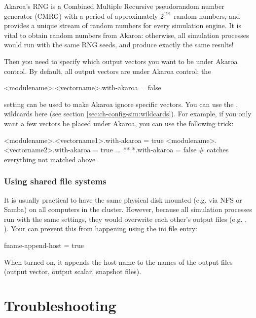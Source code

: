 Akaroa's RNG is a Combined Multiple Recursive pseudorandom
number generator (CMRG) with a period of approximately $2^{191}$
random numbers, and provides a unique stream of random numbers
for every simulation engine. It is vital to obtain random numbers
from Akaroa: otherwise, all simulation processes would run with the same
RNG seeds, and produce exactly the same results!

Then you need to specify which output vectors you want to
be under Akaroa control. By default, all output vectors are under Akaroa
control; the

\begin{inifile}
<modulename>.<vectorname>.with-akaroa = false
\end{inifile}

setting can be used to make Akaroa ignore specific vectors.
You can use the \ttt{*}, \ttt{**} wildcards here (see
section \ref{sec:ch-config-sim:wildcards}). For example,
if you only want a few vectors be placed under Akaroa,
you can use the following trick:

\begin{inifile}
<modulename>.<vectorname1>.with-akaroa = true
<modulename>.<vectorname2>.with-akaroa = true
...
**.*.with-akaroa = false  # catches everything not matched above
\end{inifile}


\subsubsection{Using shared file systems}
\label{sec:run-sim:using-shared-filesystems}

It is usually practical to have the same physical disk mounted (e.g. via NFS or Samba)
on all computers in the cluster. However, because all {\opp} simulation
processes run with the same settings, they would overwrite each other's
output files (e.g. , ).
Your can prevent this from happening using the
 ini file entry:

\begin{inifile}
[General]
fname-append-host = true
\end{inifile}

When turned on, it appends the host name to the names of the output
files (output vector, output scalar, snapshot files).



\section{Troubleshooting}

